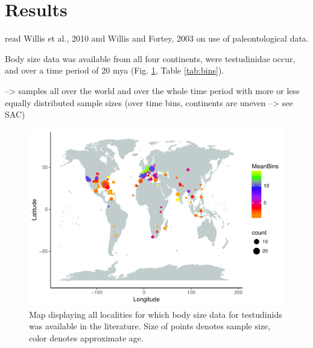 \section{Results}

read Willis et al., 2010 and Willis and Fortey, 2003 
on use of paleontological data.


Body size data was available from all four continents, were testudinidae occur, and over a time period of 20 mya (Fig. \ref{fig:mapBS}, Table \ref{tab:bins}).

--> samples all over the world and over the whole time period with more or less equally distributed sample sizes (over time bins, continents are uneven --> see SAC)





\begin{figure}[htbp]
	\centering
	\includegraphics[width=\textwidth]{MA_JJ_files/figure-latex/MapCL-1.pdf}
	\caption[Map: body size localities]{Map displaying all localities for which body size data for testudinids was available in the literature. Size of points denotes sample size, color denotes approximate age.}
	\label{fig:mapBS}
\end{figure}



